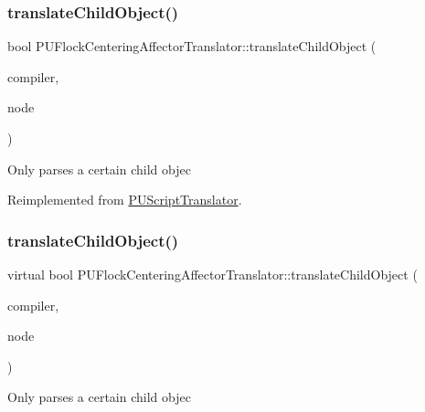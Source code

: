 \subsubsection{\texorpdfstring{translate\+Child\+Object()}{translateChildObject()}\hspace{0.1cm}{\footnotesize\ttfamily [1/2]}}
{\footnotesize\ttfamily bool P\+U\+Flock\+Centering\+Affector\+Translator\+::translate\+Child\+Object (\begin{DoxyParamCaption}\item[{\hyperlink{classPUScriptCompiler}{P\+U\+Script\+Compiler} $\ast$}]{compiler,  }\item[{\hyperlink{classPUAbstractNode}{P\+U\+Abstract\+Node} $\ast$}]{node }\end{DoxyParamCaption})\hspace{0.3cm}{\ttfamily [virtual]}}

Only parses a certain child objec 

Reimplemented from \hyperlink{classPUScriptTranslator_ab587d01348ae3e678cb700c719b2b113}{P\+U\+Script\+Translator}.

\mbox{\label{classPUFlockCenteringAffectorTranslator_a1a78c9b8b53d8e9938930d15e94c717d}} 
\subsubsection{\texorpdfstring{translate\+Child\+Object()}{translateChildObject()}\hspace{0.1cm}{\footnotesize\ttfamily [2/2]}}
{\footnotesize\ttfamily virtual bool P\+U\+Flock\+Centering\+Affector\+Translator\+::translate\+Child\+Object (\begin{DoxyParamCaption}\item[{\hyperlink{classPUScriptCompiler}{P\+U\+Script\+Compiler} $\ast$}]{compiler,  }\item[{\hyperlink{classPUAbstractNode}{P\+U\+Abstract\+Node} $\ast$}]{node }\end{DoxyParamCaption})\hspace{0.3cm}{\ttfamily [virtual]}}

Only parses a certain child objec 

